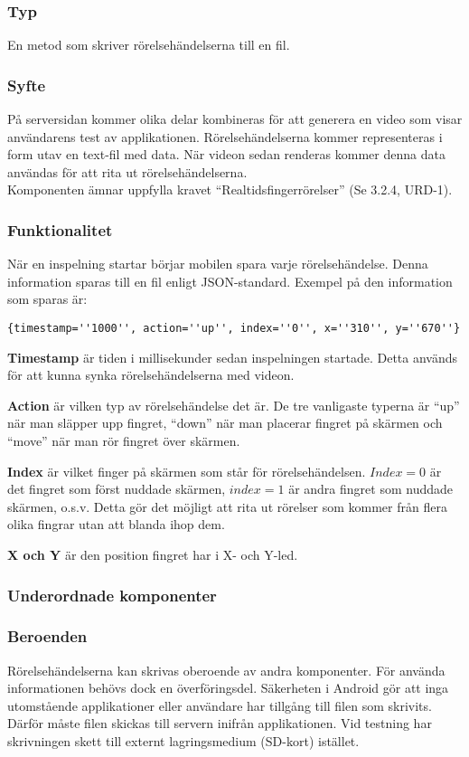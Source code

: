 \subsubsection{Typ}
En metod som skriver rörelsehändelserna till en fil.
\subsubsection{Syfte}
På serversidan kommer olika delar kombineras för att generera en video som visar användarens test av applikationen. Rörelsehändelserna kommer representeras i form utav en text-fil med data. När videon sedan renderas kommer denna data användas för att rita ut rörelsehändelserna. \\
Komponenten ämnar uppfylla kravet ``Realtidsfingerrörelser'' (Se 3.2.4, URD-1).
\subsubsection{Funktionalitet}
När en inspelning startar börjar mobilen spara varje rörelsehändelse. Denna information sparas till en fil enligt JSON-standard. Exempel på den information som sparas är: \\
\begin{verbatim}
{timestamp=''1000'', action=''up'', index=''0'', x=''310'', y=''670''}
 \end{verbatim} 
 \textbf{Timestamp} är tiden i millisekunder sedan inspelningen startade. Detta används för att kunna synka rörelsehändelserna med videon.
 
 \textbf{Action} är vilken typ av rörelsehändelse det är. De tre vanligaste typerna är ``up'' när man släpper upp fingret, ``down'' när man placerar fingret på skärmen och ``move'' när man rör fingret över skärmen.
 
 \textbf{Index} är vilket finger på skärmen som står för rörelsehändelsen. $Index=0$ är det fingret som först nuddade skärmen, $index=1$ är andra fingret som nuddade skärmen, o.s.v. Detta gör det möjligt att rita ut rörelser som kommer från flera olika fingrar utan att blanda ihop dem.
 
 \textbf{X och Y} är den position fingret har i X- och Y-led.
\subsubsection{Underordnade komponenter}

\subsubsection{Beroenden}
Rörelsehändelserna kan skrivas oberoende av andra komponenter. För använda informationen behövs dock en överföringsdel. Säkerheten i Android gör att inga utomstående applikationer eller användare har tillgång till filen som skrivits. Därför måste filen skickas till servern inifrån applikationen. Vid testning har skrivningen skett till externt lagringsmedium (SD-kort) istället.
